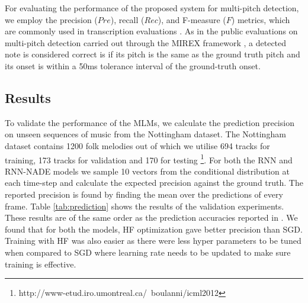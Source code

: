 For evaluating the performance of the proposed system for multi-pitch detection, we employ the precision ($\mathit{Pre}$), recall ($\mathit{Rec}$), and F-measure ($\mathit{F}$) metrics, which are commonly used in transcription evaluations \cite{MIREX}.
As in the public evaluations on multi-pitch detection carried out through the MIREX framework \cite{MIREX}, a detected note is considered correct is if its pitch is the same as the ground truth pitch and its onset is within a 50ms tolerance interval of the ground-truth onset.

\subsection{Results}

To validate the performance of the MLMs, we calculate the prediction precision on unseen sequences of music from the Nottingham dataset. The Nottingham dataset contains 1200 folk melodies out of which we utilise 694 tracks for training, 173 tracks for validation and 170 for testing \footnote{http://www-etud.iro.umontreal.ca/~boulanni/icml2012}. For both the RNN and RNN-NADE models we sample 10 vectors from the conditional distribution at each time-step and calculate the expected precision against the ground truth. The reported precision is found by finding the mean over the predictions of every frame. Table \ref{tab:prediction} shows the results of the validation experiments. These results are of the same order as the prediction accuracies reported in \cite{Boulanger-Lewandowski2012}. We found that for both the models, HF optimization gave better precision than SGD. Training with HF was also easier as there were less hyper parameters to be tuned when compared 
to SGD where learning rate needs to be updated to make sure training is effective. 

\begin{table}[t]
 \begin{center}
\end{center}
 \caption{Validation results for MLMs}
 \label{tab:prediction}
\end{table}


